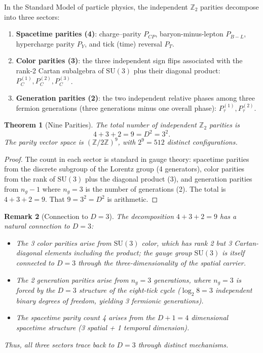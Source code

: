 \documentclass[11pt]{article}
\newtheorem{theorem}{Theorem}[section]
\newtheorem{remark}[theorem]{Remark}
\newcommand{\Z}{\mathbb{Z}}
\newcommand{\SU}{\mathrm{SU}}
\begin{document}
In the Standard Model of particle physics, the independent $\Z_2$ parities decompose into three sectors:
\begin{enumerate}
  \item \textbf{Spacetime parities (4)}: charge--parity $P_{CP}$, baryon-minus-lepton $P_{B-L}$, hypercharge parity $P_Y$, and tick (time) reversal $P_T$.
  \item \textbf{Color parities (3)}: the three independent sign flips associated with the rank-2 Cartan subalgebra of $\SU(3)$ plus their diagonal product: $P_C^{(1)}, P_C^{(2)}, P_C^{(3)}$.
  \item \textbf{Generation parities (2)}: the two independent relative phases among three fermion generations (three generations minus one overall phase): $P_\tau^{(1)}, P_\tau^{(2)}$.
\end{enumerate}

\begin{theorem}[Nine Parities]\label{thm:nine_parities}
The total number of independent $\Z_2$ parities is
\[
4 + 3 + 2 = 9 = D^2 = 3^2.
\]
The parity vector space is $(\Z/2\Z)^9$, with $2^9 = 512$ distinct configurations.
\end{theorem}

\begin{proof}
The count in each sector is standard in gauge theory: spacetime parities from the discrete subgroup of the Lorentz group (4 generators), color parities from the rank of $\SU(3)$ plus the diagonal product (3), and generation parities from $n_g - 1$ where $n_g = 3$ is the number of generations (2).
The total is $4 + 3 + 2 = 9$.
That $9 = 3^2 = D^2$ is arithmetic.
\end{proof}

\begin{remark}[Connection to $D = 3$]\label{rem:parities_D3}
The decomposition $4 + 3 + 2 = 9$ has a natural connection to $D = 3$:
\begin{itemize}
  \item The 3 color parities arise from $\SU(3)$ color, which has rank 2 but 3 Cartan-diagonal elements including the product; the gauge group $\SU(3)$ is itself connected to $D = 3$ through the three-dimensionality of the spatial carrier.
  \item The 2 generation parities arise from $n_g = 3$ generations, where $n_g = 3$ is forced by the $D = 3$ structure of the eight-tick cycle ($\log_2 8 = 3$ independent binary degrees of freedom, yielding 3 fermionic generations).
  \item The spacetime parity count 4 arises from the $D + 1 = 4$ dimensional spacetime structure (3 spatial + 1 temporal dimension).
\end{itemize}
Thus, all three sectors trace back to $D = 3$ through distinct mechanisms.
\end{remark}
\end{document}
